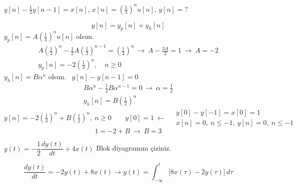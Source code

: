 \documentclass[11pt,a4paper]{article}
\begin{document}
\begin{ornek}[(Ex)]
$y[n] - \frac{1}{2}y[n-1] = x[n]$, \quad $x[n] = \left(\frac{1}{3}\right)^n u[n]$, \quad $y[n] = ?$
\end{ornek}
\begin{cozum}
\[ y[n] = y_p[n] + y_h[n] \]
$y_p[n] = A\left(\frac{1}{3}\right)^n u[n]$ olsun.
\begin{gather*}
  A\left(\tfrac{1}{3}\right)^n - \tfrac{1}{2}A\left(\tfrac{1}{3}\right)^{n-1} = \left(\tfrac{1}{3}\right)^n \ \rightarrow\ A - \frac{3A}{2} = 1 \ \rightarrow\ A = -2 \\
  y_p[n] = -2\left(\tfrac{1}{3}\right)^n, \quad n \geq 0
\end{gather*}
$y_h[n] = B\alpha^n$ olsun. \ $y[n] - y[n-1] = 0$\footnotemark
\begin{gather*}
  B\alpha^n - \tfrac{1}{2}B\alpha^{n-1} = 0 \ \rightarrow\ \alpha = \tfrac{1}{2} \\
  y_h[n] = B\left(\tfrac{1}{2}\right)^n
\end{gather*}
\[ y[n] = -2\left(\tfrac{1}{3}\right)^n + B\left(\tfrac{1}{2}\right)^n, \ n \geq 0 \qquad y[0] = 1 \ \longleftarrow\ \begin{aligned} & y[0] - y[-1] = x[0] = 1 \\ & x[n] = 0, \ n \leq -1, \ y[n] = 0, \ n \leq -1 \end{aligned} \]
\[ 1 = -2 + B \ \rightarrow\ B = 3 \]
\end{cozum}

\begin{ornek}[(Ex)]
$y(t) = -\dfrac{1}{2}\dfrac{dy(t)}{dt} + 4x(t)$ \quad Blok diyagramını çiziniz.
\end{ornek}
\begin{cozum}
\[ \frac{dy(t)}{dt} = -2y(t) + 8x(t) \longrightarrow y(t) = \int_{-\infty}^{t} \bigl[8x(\tau) - 2y(\tau)\bigr]\,d\tau \]
\begin{center}
\end{center}
\end{cozum}
\end{document}

